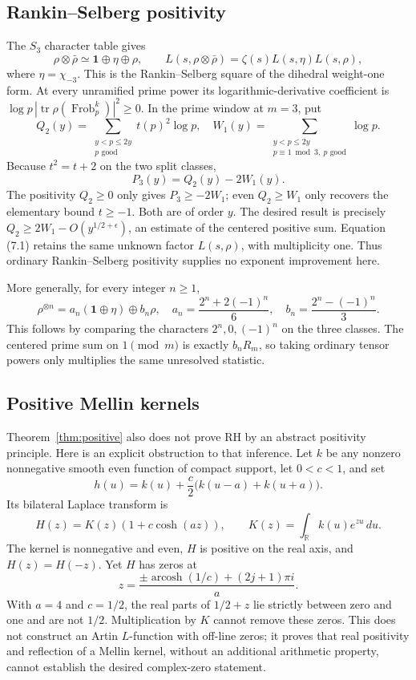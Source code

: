 \documentclass[11pt]{article}
\newcommand{\R}{\mathbb R}
\newcommand{\tr}{\operatorname{tr}}
\newcommand{\Frob}{\operatorname{Frob}}
\begin{document}
\subsection{Rankin--Selberg positivity}
The $S_3$ character table gives
\[
 \rho\otimes\bar\rho\simeq\mathbf1\oplus\eta\oplus\rho,
 \qquad L(s,\rho\otimes\bar\rho)=\zeta(s)L(s,\eta)L(s,\rho),
 \tag{7.1}
\]
where $\eta=\chi_{-3}$. This is the Rankin--Selberg square of the dihedral weight-one form. At every unramified prime power its logarithmic-derivative coefficient is $\log p\,|\tr\rho(\Frob_p^k)|^2\ge0$. In the prime window at $m=3$, put
\[
 Q_2(y)=\sum_{\substack{y<p\le2y\\p\text{ good}}}t(p)^2\log p,
 \quad W_1(y)=\sum_{\substack{y<p\le2y\\p\equiv1\bmod3,\ p\text{ good}}}\log p.
\]
Because $t^2=t+2$ on the two split classes,
\[
                         P_3(y)=Q_2(y)-2W_1(y).
 \tag{7.2}
\]
The positivity $Q_2\ge0$ only gives $P_3\ge-2W_1$; even $Q_2\ge W_1$ only recovers the elementary bound $t\ge-1$. Both are of order $y$. The desired result is precisely $Q_2\ge2W_1-O(y^{1/2+\epsilon})$, an estimate of the centered positive sum. Equation (7.1) retains the same unknown factor $L(s,\rho)$, with multiplicity one. Thus ordinary Rankin--Selberg positivity supplies no exponent improvement here.

More generally, for every integer $n\ge1$,
\[
 \rho^{\otimes n}=a_n(\mathbf1\oplus\eta)\oplus b_n\rho,
 \quad a_n=\frac{2^n+2(-1)^n}{6},\quad
 b_n=\frac{2^n-(-1)^n}{3}.
 \tag{7.3}
\]
This follows by comparing the characters $2^n,0,(-1)^n$ on the three classes. The centered prime sum on $1\pmod m$ is exactly $b_nR_m$, so taking ordinary tensor powers only multiplies the same unresolved statistic.

\subsection{Positive Mellin kernels}
Theorem~\ref{thm:positive} also does not prove RH by an abstract positivity principle. Here is an explicit obstruction to that inference. Let $k$ be any nonzero nonnegative smooth even function of compact support, let $0<c<1$, and set
\[
 h(u)=k(u)+\frac c2\bigl(k(u-a)+k(u+a)\bigr).
\]
Its bilateral Laplace transform is
\[
 H(z)=K(z)(1+c\cosh(az)),\qquad K(z)=\int_\R k(u)e^{zu}\,du.
\]
The kernel is nonnegative and even, $H$ is positive on the real axis, and $H(z)=H(-z)$. Yet $H$ has zeros at
\[
 z=\frac{\pm\operatorname{arcosh}(1/c)+(2j+1)\pi i}{a}.
 \tag{7.4}
\]
With $a=4$ and $c=1/2$, the real parts of $1/2+z$ lie strictly between zero and one and are not $1/2$. Multiplication by $K$ cannot remove these zeros. This does not construct an Artin $L$-function with off-line zeros; it proves that real positivity and reflection of a Mellin kernel, without an additional arithmetic property, cannot establish the desired complex-zero statement.
\end{document}
